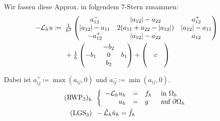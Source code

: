 \documentclass{cheat-sheet}
\newcommand{\bOmega}{\partial \Omega} %
\newcommand{\LL}{\mathcal{L}} %
\newcommand{\tss}[1]{\textsubscript{#1}} %
\begin{document}
\begin{verf}
\begin{enumerate}
    \iffalse
    Insgesamt haben wir als Approximation
    \begin{align*}
      - \LL u(x, y) & \approx \tfrac{1}{h^2} \left( (-a_{11} + \abs{a_{12}} + \nicefrac{h}{2} b_1) u(x-h, y) \right. \\
      & + (-a_{11} + \abs{a_{12}} - \nicefrac{h}{2} b_1) u(x + h, y) \\
      & + (2 a_{11} + 2 a_{22} - 2 \abs{a_{12}} + h^2 c) u(x, y) \\
      & + (-a_{22} + \abs{a_{12}} + \nicefrac{h}{2} b_2) u(x, y-h) \\
      & + (-a_{22} + \abs{a_{12}} - \nicefrac{h}{2} b_2) u(x, y+h) \\
      & + (- \max(a_{12}, 0) u(x-h, y-h) \\
      & + (- \max(a_{12}, 0)) u(x+h, y+h) \\
      & + \min(a_{12}, 0) u(x-h, y+h) \\
      & \left. + \min(a_{12}, 0) u(x + h, x - h)) \right)
    \end{align*}
    \fi
    
    Wir fassen diese Approx. in folgendem 7-Stern zusammen:
    \begin{align*}
      - \LL_h u \coloneqq \enspace
      & \tfrac{1}{h^2} \begin{pmatrix}
        a_{12}^{-} & \abs{a_{12}} - a_{22} & a_{12}^{+} \\
        \abs{a_{12}} - a_{11} & 2 (a_{11} + a_{22} - \abs{a_{12}}) & \abs{a_{12}} - a_{11} \\
        - a_{12}^{+} & \abs{a_{12}} - a_{22} & a_{12}
      \end{pmatrix} \\
      & + \tfrac{1}{h} \begin{pmatrix}
        & - b_2 \\
        - b_1 & 0 & b_1 \\
        & b_2
      \end{pmatrix}
      + \begin{pmatrix}
        \\ & c & \\ &
      \end{pmatrix}
    \end{align*}
  \end{enumerate}
  Dabei ist $a_{ij}^{+} \coloneqq \max(a_{ij}, 0)$ und $a_{ij}^{-} \coloneqq \min(a_{ij}, 0)$.
  \begin{align*}
    \text{(RWP\tss{3})\tss{h}} \enspace & \left\{ \begin{array}{rlll}
      - \LL_h u_h &=& f_h &\text{ in $\Omega_h$} \\
      u_h &=& g &\text{ auf $\bOmega_h$}
    \end{array} \right. \\
    \text{(LGS\tss{3})} \enspace
    & - \tilde{\LL}_h \tilde{u}_h = \tilde{f}_h
  \end{align*}
\end{verf}
\end{document}
